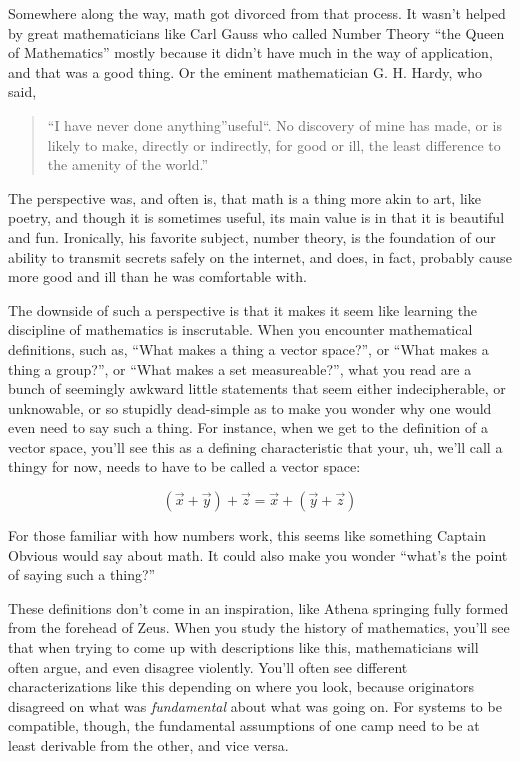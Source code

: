 \documentclass[
]{book}
\begin{document}
Somewhere along the way, math got divorced from that process. It wasn't helped by great mathematicians like Carl Gauss who called Number Theory ``the Queen of Mathematics'' mostly because it didn't have much in the way of application, and that was a good thing. Or the eminent mathematician G. H. Hardy, who said,

\begin{quote}
``I have never done anything''useful``. No discovery of mine has made, or is likely to make, directly or indirectly, for good or ill, the least difference to the amenity of the world.''
\end{quote}

The perspective was, and often is, that math is a thing more akin to art, like poetry, and though it is sometimes useful, its main value is in that it is beautiful and fun. Ironically, his favorite subject, number theory, is the foundation of our ability to transmit secrets safely on the internet, and does, in fact, probably cause more good and ill than he was comfortable with.

The downside of such a perspective is that it makes it seem like learning the discipline of mathematics is inscrutable. When you encounter mathematical definitions, such as, ``What makes a thing a vector space?'', or ``What makes a thing a group?'', or ``What makes a set measureable?'', what you read are a bunch of seemingly awkward little statements that seem either indecipherable, or unknowable, or so stupidly dead-simple as to make you wonder why one would even need to say such a thing. For instance, when we get to the definition of a vector space, you'll see this as a defining characteristic that your, uh, we'll call a thingy for now, needs to have to be called a vector space:

\[ (\vec{x} + \vec{y}) + \vec{z} = \vec{x} + (\vec{y} + \vec{z}) \]

For those familiar with how numbers work, this seems like something Captain Obvious would say about math. It could also make you wonder ``what's the point of saying such a thing?''

These definitions don't come in an inspiration, like Athena springing fully formed from the forehead of Zeus. When you study the history of mathematics, you'll see that when trying to come up with descriptions like this, mathematicians will often argue, and even disagree violently. You'll often see different characterizations like this depending on where you look, because originators disagreed on what was \emph{fundamental} about what was going on. For systems to be compatible, though, the fundamental assumptions of one camp need to be at least derivable from the other, and vice versa.
\end{document}

